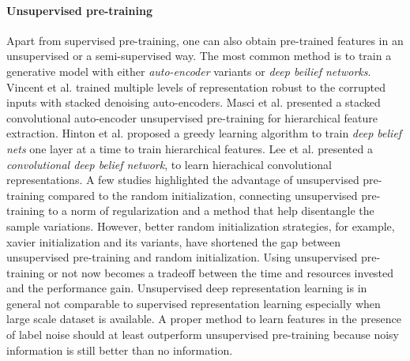 \paragraph{Unsupervised pre-training}
Apart from supervised pre-training, one can also obtain pre-trained features in an unsupervised or a semi-supervised way.
The most common method is to train a generative model with either \textit{auto-encoder} variants or \textit{deep beilief networks}.
Vincent et al.\cite{vincent2010stacked} trained multiple levels of representation robust to the corrupted inputs with stacked denoising auto-encoders.
Masci et al.\cite{masci2011stacked} presented a stacked convolutional auto-encoder unsupervised pre-training for hierarchical feature extraction.
Hinton et al.\cite{hinton2006fast} proposed a greedy learning algorithm to train \textit{deep belief nets} one layer at a time to train hierarchical features.
Lee et al.\cite{lee2009convolutional} presented a \textit{convolutional deep belief network}, to learn hierachical convolutional representations.
A few studies\cite{erhan2009difficulty,erhan2010does,bengio2012deep} highlighted the advantage of unsupervised pre-training compared to the random initialization, connecting unsupervised pre-training to a norm of regularization and a method that help disentangle the sample variations.
However, better random initialization strategies, for example, xavier initialization\cite{glorot2010understanding} and its variants, have shortened the gap between unsupervised pre-training and random initialization.
Using unsupervised pre-training or not now becomes a tradeoff between the time and resources invested and the performance gain.
Unsupervised deep representation learning is in general not comparable to supervised representation learning especially when large scale dataset is available.
A proper method to learn features in the presence of label noise should at least outperform  unsupervised pre-training because noisy information is still better than no information.

